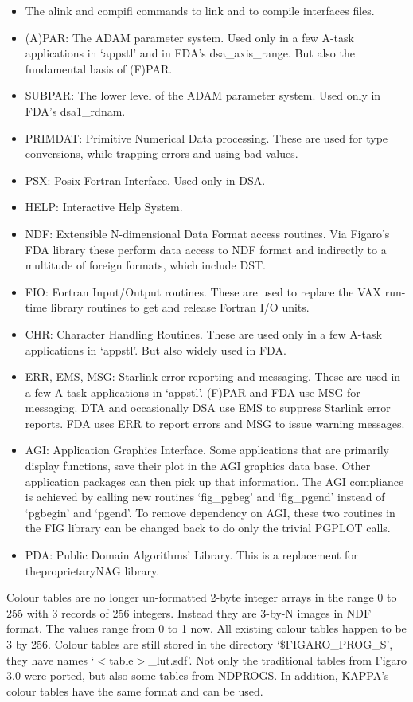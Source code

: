 \begin{itemize}
\item The alink and compifl commands to link and to compile interfaces
   files.
\item (A)PAR: The ADAM parameter system. Used only in a few A-task
   applications in `appstl' and in FDA's dsa\_axis\_range. But also
   the fundamental basis of (F)PAR.
\item SUBPAR: The lower level of the ADAM parameter system. Used only
   in FDA's dsa1\_\-rdnam.
\item PRIMDAT: Primitive Numerical Data processing. These are used for type
   conversions, while trapping errors and using bad values.
\item PSX: Posix Fortran Interface. Used only in DSA.
\item HELP: Interactive Help System.
\item NDF: Extensible N-dimensional Data Format access routines. Via
   Figaro's FDA library these perform data access to NDF format and
   indirectly to a multitude of foreign formats, which include DST.
\item FIO: Fortran Input/Output routines. These are used to replace the
   VAX run-time library routines to get and release Fortran I/O units.
\item CHR: Character Handling Routines. These are used only in a few
   A-task applications in `appstl'. But also widely used in FDA.
\item ERR, EMS, MSG: Starlink error reporting and messaging. These are
   used in a few A-task applications in `appstl'. (F)PAR and FDA use MSG
   for messaging. DTA and occasionally DSA use EMS to suppress
   Starlink error reports. FDA uses ERR to report errors and MSG to
   issue warning messages.
\item AGI: Application Graphics Interface. Some applications that are
   primarily display functions, save their plot in the AGI graphics data
   base. Other application packages can then pick up that information.
   The AGI compliance is achieved by calling new routines `fig\_pgbeg'
   and `fig\_pgend' instead of `pgbegin' and `pgend'. To remove
   dependency on AGI, these two routines in the FIG library can be
   changed back to do only the trivial PGPLOT calls.
\item PDA: Public Domain Algorithms' Library. This is a replacement for
   the\latorhtm{---}{-}proprietary\latorhtm{---}{-}NAG library.
\end{itemize}

   Colour tables are no longer un-formatted 2-byte integer arrays in the
   range 0 to 255 with 3 records of 256 integers.  Instead they are
   3-by-N images in NDF format.  The values range from 0 to 1 now.  All
   existing colour tables happen to be 3 by 256.  Colour tables are
   still stored in the directory `\$FIGARO\_PROG\_S', they have names
   `$<$table$>$\_lut.sdf'.  Not only the traditional tables from Figaro 3.0
   were ported, but also some tables from NDPROGS.  In addition, KAPPA's
   colour tables have the same format and can be used.

